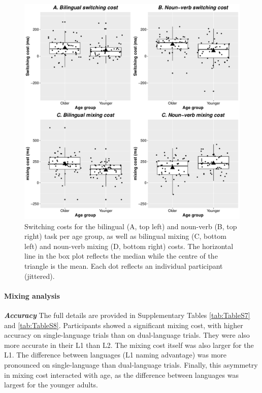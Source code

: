 \documentclass[
]{article}
\begin{document}
\begin{figure}
\centering
\includegraphics{Figure1.pdf}
\caption{\label{fig:Figure1}Switching costs for the bilingual (A, top left) and noun-verb (B, top right) task per age group, as well as bilingual mixing (C, bottom left) and noun-verb mixing (D, bottom right) costs. The horizontal line in the box plot reflects the median while the centre of the triangle is the mean. Each dot reflects an individual participant (jittered).}
\end{figure}

\hypertarget{mixing-analysis}{%
\paragraph{Mixing analysis}\label{mixing-analysis}}

\hfill\break

\textbf{\emph{Accuracy}}
The full details are provided in Supplementary Tables \ref{tab:TableS7} and \ref{tab:TableS8}. Participants showed a significant mixing cost, with higher accuracy on single-language trials than on dual-language trials. They were also more accurate in their L1 than L2. The mixing cost itself was also larger for the L1. The difference between languages (L1 naming advantage) was more pronounced on single-language than dual-language trials. Finally, this asymmetry in mixing cost interacted with age, as the difference between languages was largest for the younger adults.
\end{document}

